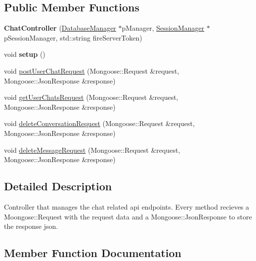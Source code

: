 \subsection*{Public Member Functions}
\begin{DoxyCompactItemize}
\item 
{\bfseries Chat\+Controller} (\hyperlink{classDatabaseManager}{Database\+Manager} $\ast$p\+Manager, \hyperlink{classSessionManager}{Session\+Manager} $\ast$p\+Session\+Manager, std\+::string fire\+Server\+Token)\hypertarget{classChatController_a61968183ea481dca8a6b303532aadb4b}{}\label{classChatController_a61968183ea481dca8a6b303532aadb4b}

\item 
void {\bfseries setup} ()\hypertarget{classChatController_a3bbf4b8db89c6e35f6fb4e35b52cf06e}{}\label{classChatController_a3bbf4b8db89c6e35f6fb4e35b52cf06e}

\item 
void \hyperlink{classChatController_a0fec4ddc971ac48152b95eff2094616b}{post\+User\+Chat\+Request} (Mongoose\+::\+Request \&request, Mongoose\+::\+Json\+Response \&response)
\item 
void \hyperlink{classChatController_ac7099d629232418a4834a4d7bb46a026}{get\+User\+Chats\+Request} (Mongoose\+::\+Request \&request, Mongoose\+::\+Json\+Response \&response)
\item 
void \hyperlink{classChatController_a1b70506b3e64214f97aac62fdd93df1b}{delete\+Conversation\+Request} (Mongoose\+::\+Request \&request, Mongoose\+::\+Json\+Response \&response)
\item 
void \hyperlink{classChatController_a0dfd8abc1196567c30eb5fbb5d355179}{delete\+Message\+Request} (Mongoose\+::\+Request \&request, Mongoose\+::\+Json\+Response \&response)
\end{DoxyCompactItemize}


\subsection{Detailed Description}
Controller that manages the chat related api endpoints. Every method recieves a Moongose\+::\+Request with the request data and a Mongoose\+::\+Json\+Response to store the response json. 

\subsection{Member Function Documentation}
